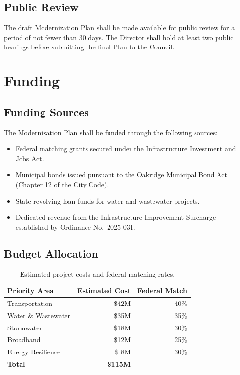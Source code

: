 \documentclass[
    language=english,
    doctype=article,
    institution=none,
]{../../omnilatex}
\begin{document}
\subsection{Public Review}

The draft Modernization Plan shall be made available for public review for
a period of not fewer than 30 days. The Director shall hold at least two
public hearings before submitting the final Plan to the Council.

\section{Funding}

\subsection{Funding Sources}

The Modernization Plan shall be funded through the following sources:

\begin{itemize}
    \item Federal matching grants secured under the Infrastructure
        Investment and Jobs Act.
    \item Municipal bonds issued pursuant to the Oakridge Municipal Bond
        Act (Chapter 12 of the City Code).
    \item State revolving loan funds for water and wastewater projects.
    \item Dedicated revenue from the Infrastructure Improvement Surcharge
        established by Ordinance No.\ 2025-031.
\end{itemize}

\subsection{Budget Allocation}

\begin{table}[h]
    \centering
    \begin{tabular}{lrr}
        \toprule
        \textbf{Priority Area} & \textbf{Estimated Cost} & \textbf{Federal Match} \\
        \midrule
        Transportation      & \$42M  & 40\% \\
        Water \& Wastewater  & \$35M  & 35\% \\
        Stormwater           & \$18M  & 30\% \\
        Broadband            & \$12M  & 25\% \\
        Energy Resilience    & \$ 8M  & 30\% \\
        \midrule
        \textbf{Total}       & \textbf{\$115M} & --- \\
        \bottomrule
    \end{tabular}
    \caption{Estimated project costs and federal matching rates.}
\end{table}
\end{document}
